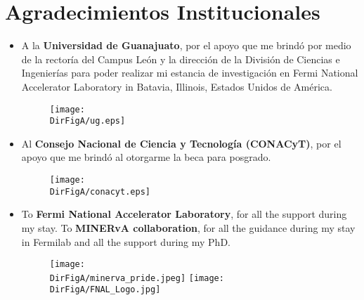 \chapter*{Agradecimientos Institucionales}
\label{Cap:Agr2}

\begin{itemize} 

\item A la \textbf{Universidad de Guanajuato}, por el apoyo que me brindó por medio de la rectoría del Campus Le\'on y la dirección de la División de Ciencias e Ingenierías para poder realizar mi estancia de investigación en Fermi National Accelerator Laboratory in Batavia, Illinois, Estados Unidos de Am\'erica.

\begin{figure}[h]
	\centering
	\texttt{[image: \\DirFigA/ug.eps]}
\end{figure}

\item Al \textbf{Consejo Nacional de Ciencia y Tecnología (CONACyT)}, por el apoyo que me brindó al otorgarme la beca para posgrado. 

\begin{figure}[h]
	\centering	
	\texttt{[image: \\DirFigA/conacyt.eps]}
\end{figure}

\item To \textbf{Fermi National Accelerator Laboratory}, for all the support during my stay. To \textbf{MINERvA collaboration}, for all the guidance during my stay in Fermilab and all the support during my PhD.

\begin{figure}[h]
	\centering	
	\texttt{[image: \\DirFigA/minerva\_pride.jpeg]}
    \texttt{[image: \\DirFigA/FNAL\_Logo.jpg]}
\end{figure}

\end{itemize}

\newpage